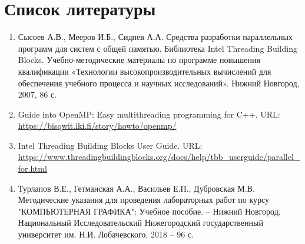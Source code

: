 \documentclass{report}
\begin{document}
\section*{Список литературы}
    \begin{enumerate}
        \item Сысоев А.В., Мееров И.Б., Сиднев А.А. Средства разработки параллельных программ для систем с общей памятью. Библиотека Intel Threading Building Blocks. Учебно-методические материалы по программе повышения квалификации «Технологии высокопроизводительных вычислений для обеспечения учебного процесса и научных исследований». Нижний Новгород, 2007, 86 с.
        \item Guide into OpenMP: Easy multithreading programming for C++. URL: \url{https://bisqwit.iki.fi/story/howto/openmp/}
        \item Intel Threading Building Blocks User Guide. URL: \url{https://www.threadingbuildingblocks.org/docs/help/tbb_userguide/parallel_for.html}
        \item Турлапов В.Е., Гетманская А.А., Васильев Е.П., Дубровская М.В. Методические указания для проведения лабораторных работ по курсу "КОМПЬЮТЕРНАЯ ГРАФИКА": Учебное пособие. – Нижний Новгород, Национальный Исследовательский Нижегородский государственный университет им. Н.И. Лобачевского, 2018 – 96 с.
    \end{enumerate}
\newpage

\end{document}
